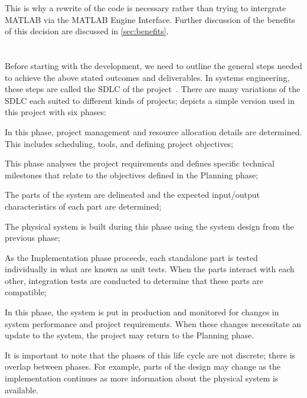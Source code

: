 This is why a rewrite of the code is necessary rather than trying
to intergrate MATLAB via the MATLAB Engine Interface. Further
discussion of the benefits of this decision are discussed in \cref{sec:benefits}.

\section[\glsentrylong{SDLC}]{}\label{sec:sdlc}

Before starting with the development, we need to outline the general steps
needed to achieve the above stated outcomes and deliverables. In systems engineering,
these steps are called the \acrfull{SDLC} of the project~\autocite{IRM-SDLC:DoJ:2003}.
There are many variations of the \acrshort{SDLC} each suited to different kinds
of projects;  depicts a simple version used in this project with six phases:

\begin{description}[font=\textpluscolon]
	\item[Planning] In this phase, project management
		and resource allocation details are determined.
		This includes scheduling, tools, and
		defining project objectives;
	\item[Analysis] This phase analyses the project
		requirements and defines specific
		technical milestones that relate to the
		objectives defined in the Planning phase;
	\item[Design] The parts of the system are
		delineated and the expected input/output
		characteristics of each part are
		determined;
	\item[Implementation] The physical system is built
		during this phase using the system design
		from the previous phase;
	\item[Testing] As the Implementation phase
		proceeds, each standalone part is tested
		individually in what are known as unit
		tests. When the parts interact with each
		other, integration tests are conducted to
		determine that these parts are compatible;
	\item[Maintenance] In this phase, the system is put in
		production and monitored for changes in system
		performance and project requirements. When these
		changes necessitate an update to the system, the
		project may return to the Planning phase.
\end{description}

It is important to note that the phases of this life cycle
are not discrete; there is overlap between phases. For
example, parts of the design may change as the
implementation continues as more information about the
physical system is available.

